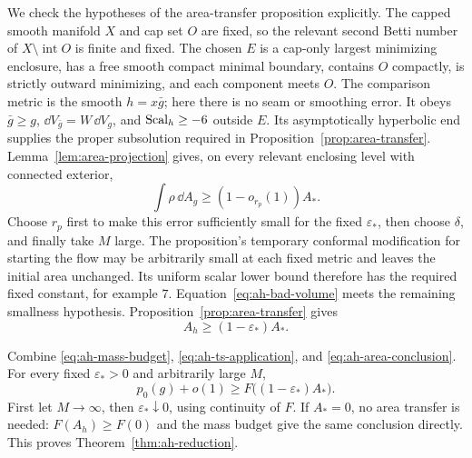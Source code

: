 We check the hypotheses of the area-transfer proposition
explicitly.  The capped smooth manifold \(X\) and cap
set \(O\) are fixed, so the relevant second Betti number
of \(X\setminus\operatorname{int}O\) is finite and fixed.
The chosen \(E\) is a cap-only largest minimizing
enclosure, has a free smooth compact minimal boundary,
contains \(O\) compactly, is strictly outward minimizing,
and each component meets \(O\).  The comparison metric
is the smooth \(h=x\bar g\); here there is no seam or
smoothing error.  It obeys
\(\bar g\ge g\), \(\dd V_{\bar g}=W\,\dd V_g\), and
\(\operatorname{Scal}_h\ge-6\) outside \(E\).
Its asymptotically hyperbolic end supplies the proper
subsolution required in Proposition~\ref{prop:area-transfer}.
Lemma~\ref{lem:area-projection} gives, on every relevant
enclosing level with connected exterior,
\[
 \int\rho\,\dd A_g\ge(1-o_{r_p}(1))A_*.
\]
Choose \(r_p\) first to make this error sufficiently
small for the fixed \(\varepsilon_*\), then choose
\(\delta\), and finally take \(M\) large.
The proposition's temporary conformal modification
for starting the flow may be arbitrarily small at
each fixed metric and leaves the initial area
unchanged.  Its uniform scalar lower bound therefore
has the required fixed constant, for example \(7\).
Equation~\eqref{eq:ah-bad-volume} meets the remaining
smallness hypothesis.  Proposition~\ref{prop:area-transfer}
gives
\begin{equation}\label{eq:ah-area-conclusion}
 A_h\ge(1-\varepsilon_*)A_* .
\end{equation}

Combine \eqref{eq:ah-mass-budget},
\eqref{eq:ah-ts-application}, and
\eqref{eq:ah-area-conclusion}.  For every fixed
\(\varepsilon_*>0\) and arbitrarily large \(M\),
\[
 p_0(g)+o(1)\ge F\bigl((1-\varepsilon_*)A_*\bigr).
\]
First let \(M\to\infty\), then
\(\varepsilon_*\downarrow0\), using continuity of \(F\).
If \(A_*=0\), no area transfer is needed:
\(F(A_h)\ge F(0)\) and the mass budget give the
same conclusion directly.  This proves
Theorem~\ref{thm:ah-reduction}.
